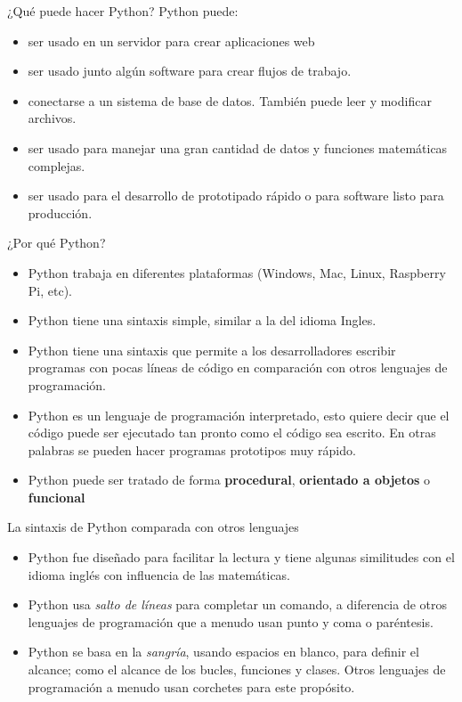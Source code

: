 \begin{frame}[c]{¿Qué puede hacer Python?}
  Python puede:
  \begin{itemize}
    \item ser usado en un servidor para crear aplicaciones web
    \pausa
    \item ser usado junto algún software para crear flujos de trabajo.
    \pausa
    \item conectarse a un sistema de base de datos. También puede leer y
          modificar archivos.
    \pausa
    \item ser usado para manejar una gran cantidad de datos y funciones
          matemáticas complejas.
    \pausa
    \item ser usado para el desarrollo de prototipado rápido o para software
          listo para producción.
  \end{itemize}
\end{frame}

\begin{frame}[c]{¿Por qué Python?}
  \begin{itemize}
    \item Python trabaja en diferentes plataformas (Windows, Mac, Linux,
      Raspberry Pi, etc).
    \pausa
    \item Python tiene una sintaxis simple, similar a la del idioma Ingles.
    \pausa
    \item Python tiene una sintaxis que permite a los desarrolladores
      escribir programas con pocas líneas de código en comparación con otros
      lenguajes de programación.
    \pausa
    \item Python es un lenguaje de programación interpretado, esto quiere
      decir que el código puede ser ejecutado tan pronto como el código sea
      escrito. En otras palabras se pueden hacer programas prototipos muy
      rápido.
    \pausa
    \item Python puede ser tratado de forma \textbf{procedural},
      \textbf{orientado a objetos} o \textbf{funcional}
  \end{itemize}
\end{frame}

\begin{frame}[c]{La sintaxis de Python comparada con otros lenguajes}
  \begin{itemize}
    \item Python fue diseñado para facilitar la lectura y tiene algunas
      similitudes con el idioma inglés con influencia de las matemáticas.
    \pausa
    \item Python usa \emph{salto de líneas} para completar un comando, a
      diferencia de otros lenguajes de programación que a menudo usan punto
      y coma o paréntesis.
    \pausa
    \item Python se basa en la \emph{sangría}, usando espacios en blanco, para
      definir el alcance; como el alcance de los bucles, funciones y clases.
      Otros lenguajes de programación a menudo usan corchetes para este
      propósito.
  \end{itemize}
\end{frame}

